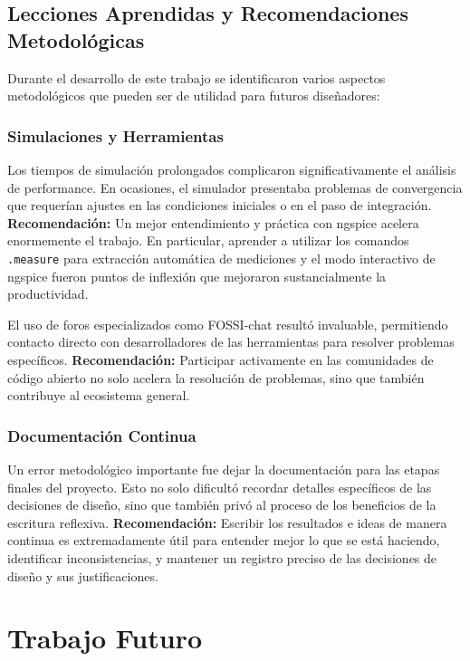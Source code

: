 \documentclass[12pt,a4paper]{report}
\begin{document}
\subsection{Lecciones Aprendidas y Recomendaciones Metodológicas}

Durante el desarrollo de este trabajo se identificaron varios aspectos metodológicos que pueden ser de utilidad para futuros diseñadores:





\subsubsection{Simulaciones y Herramientas}

Los tiempos de simulación prolongados complicaron significativamente el análisis de performance. En ocasiones, el simulador presentaba problemas de convergencia que requerían ajustes en las condiciones iniciales o en el paso de integración. \textbf{Recomendación:} Un mejor entendimiento y práctica con ngspice acelera enormemente el trabajo. En particular, aprender a utilizar los comandos \texttt{.measure} para extracción automática de mediciones y el modo interactivo de ngspice fueron puntos de inflexión que mejoraron sustancialmente la productividad. 

El uso de foros especializados como FOSSI-chat resultó invaluable, permitiendo contacto directo con desarrolladores de las herramientas para resolver problemas específicos. \textbf{Recomendación:} Participar activamente en las comunidades de código abierto no solo acelera la resolución de problemas, sino que también contribuye al ecosistema general.

\subsubsection{Documentación Continua}

Un error metodológico importante fue dejar la documentación para las etapas finales del proyecto. Esto no solo dificultó recordar detalles específicos de las decisiones de diseño, sino que también privó al proceso de los beneficios de la escritura reflexiva. \textbf{Recomendación:} Escribir los resultados e ideas de manera continua es extremadamente útil para entender mejor lo que se está haciendo, identificar inconsistencias, y mantener un registro preciso de las decisiones de diseño y sus justificaciones.

\section{Trabajo Futuro}
\end{document}

